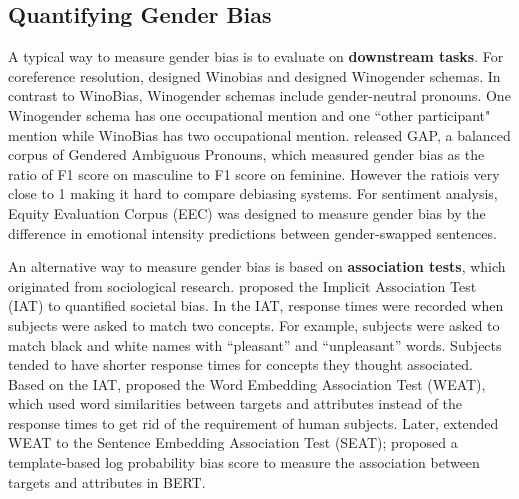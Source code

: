 \subsection{Quantifying Gender Bias}
A typical way to measure gender bias is to evaluate on \textbf{downstream tasks}. For coreference resolution, \citet{zhao2018gender} designed Winobias and \citet{rudinger2018gender} designed Winogender schemas. In contrast to WinoBias, Winogender schemas include gender-neutral pronouns. One Winogender schema has one occupational mention and one ``other participant" mention while WinoBias has two occupational mention. \citet{webster2018mind} released GAP, a balanced corpus of Gendered Ambiguous Pronouns, which measured gender bias as the ratio of F1 score on masculine to F1 score on feminine. However the ratiois very close to 1 \citep{Chada_2019, Attree_2019} making it hard to compare debiasing systems. For sentiment analysis, Equity Evaluation Corpus (EEC) \citep{Kiritchenko_2018} was designed to measure gender bias by the difference in emotional intensity predictions between gender-swapped sentences.

An alternative way to measure gender bias is based on \textbf{association tests}, which originated from sociological research. \citet{greenwald1998measuring} proposed the Implicit Association Test (IAT) to quantified societal bias. In the IAT, response times were recorded when subjects were asked to match two concepts. For example, subjects were asked to match black and white names with “pleasant” and “unpleasant” words. Subjects tended to have shorter response times for concepts they thought associated. Based on the IAT, \citet{caliskan2017semantics} proposed the Word Embedding Association Test (WEAT), which used word similarities between targets and attributes instead of the response times to get rid of the requirement of human subjects. Later, \citet{may2019measuring} extended WEAT to the Sentence Embedding Association Test (SEAT); \citet{kurita2019measuring} proposed a template-based log probability bias score to measure the association between targets and attributes in BERT.

